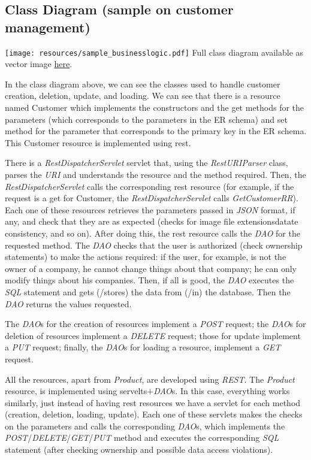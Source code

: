 \subsection{Class Diagram (sample on customer management)}


\texttt{[image: resources/sample\_businesslogic.pdf]}
Full class diagram available as vector image \href{https://drive.google.com/file/d/1cTR0OGGH9rbpp6zuY7K3tNlbGnMKxU8j/view?usp=share_link}{here}.

\pagebreak

 
In the class diagram above, we can see the classes used to handle customer creation, deletion, update, and loading. We can see that there is a resource named Customer which implements the constructors and the get methods for the parameters (which corresponds to the parameters in the ER schema) and set method for the parameter that corresponds to the primary key in the ER schema. This Customer resource is implemented using rest. 

There is a \textit{RestDispatcherServlet} servlet that, using the \textit{RestURIParser} class, parses the \textit{URI} and understands the resource and the method required. Then, the \textit{RestDispatcherServlet} calls the corresponding rest resource (for example, if the request is a get for Customer, the \textit{RestDispatcherServlet} calls \textit{GetCustomerRR}). Each one of these resources retrieves the parameters passed in \textit{JSON} format, if any, and check that they are as expected (checks for image file extensionsdatate consistency, and so on). After doing this, the rest resource calls the \textit{DAO} for the requested method. The \textit{DAO} checks that the user is authorized (check ownership statements) to make the actions required: if the user, for example, is not the owner of a company, he cannot change things about that company; he can only modify things about his companies. Then, if all is good, the \textit{DAO} executes the \textit{SQL} statement and gets (/stores) the data from (/in) the database. Then the \textit{DAO} returns the values requested.

The \textit{DAO}s for the creation of resources implement a \textit{POST} request; the \textit{DAO}s for deletion of resources implement a \textit{DELETE} request; those for update implement a \textit{PUT} request; finally, the \textit{DAO}s for loading a resource, implement a \textit{GET} request.

\vspace{0.5 cm}

All the resources, apart from \textit{Product}, are developed using \textit{REST}. 
The \textit{Product} resource, is implemented using servelts+\textit{DAO}s. In this case, everything works similarly, just instead of having rest resources we have a servlet for each method (creation, deletion, loading, update). Each one of these servlets makes the checks on the parameters and calls the corresponding \textit{DAO}s, which implements the \textit{POST}/\textit{DELETE}/\textit{GET}/\textit{PUT} method and executes the corresponding \textit{SQL} statement (after checking ownership and possible data access violations).
